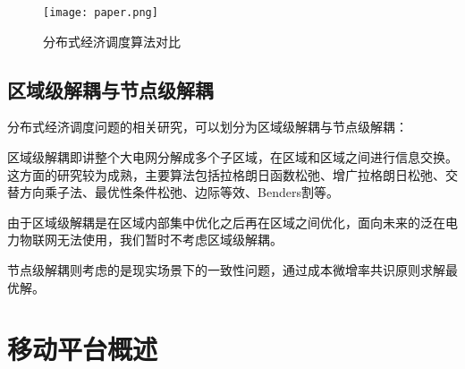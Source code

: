 




\begin{figure}[htbp] %
    \centering
    \texttt{[image: paper.png]}
    \caption{分布式经济调度算法对比}
    \label{fig:CompareAlgorithm}
\end{figure}

\subsection{区域级解耦与节点级解耦}

分布式经济调度问题的相关研究，可以划分为区域级解耦与节点级解耦：

区域级解耦即讲整个大电网分解成多个子区域，在区域和区域之间进行信息交换。这方面的研究较为成熟，主要算法包括拉格朗日函数松弛、增广拉格朗日松弛、交替方向乘子法、最优性条件松弛、边际等效、Benders割等。

由于区域级解耦是在区域内部集中优化之后再在区域之间优化，面向未来的泛在电力物联网无法使用，我们暂时不考虑区域级解耦。

节点级解耦则考虑的是现实场景下的一致性问题，通过成本微增率共识原则求解最优解。

\section{移动平台概述}

